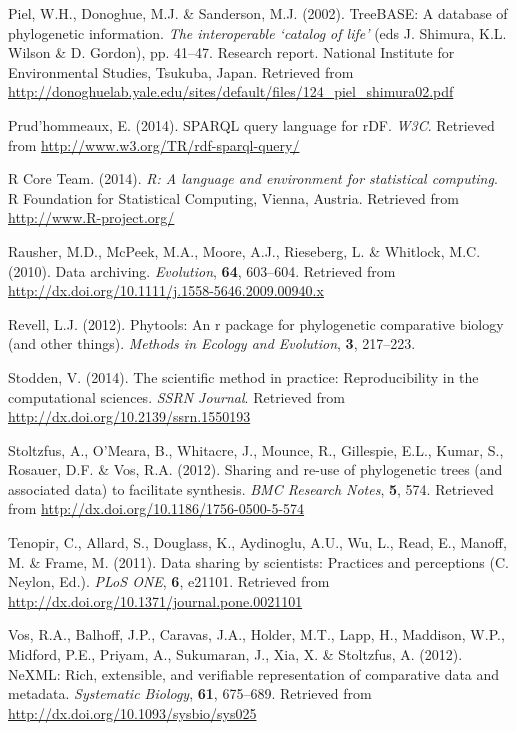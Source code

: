 \documentclass[author-year, review, 11pt]{components/elsarticle} %
\begin{document}
\hypertarget{ref-Pielux5f2002}{}
Piel, W.H., Donoghue, M.J. \& Sanderson, M.J. (2002). TreeBASE: A
database of phylogenetic information. \emph{The interoperable `catalog
of life'} (eds J. Shimura, K.L. Wilson \& D. Gordon), pp. 41--47.
Research report. National Institute for Environmental Studies, Tsukuba,
Japan. Retrieved from
\url{http://donoghuelab.yale.edu/sites/default/files/124_piel_shimura02.pdf}

\hypertarget{ref-W3Cux5f2014}{}
Prud'hommeaux, E. (2014). SPARQL query language for rDF. \emph{W3C}.
Retrieved from \url{http://www.w3.org/TR/rdf-sparql-query/}

\hypertarget{ref-R}{}
R Core Team. (2014). \emph{R: A language and environment for statistical
computing}. R Foundation for Statistical Computing, Vienna, Austria.
Retrieved from \url{http://www.R-project.org/}

\hypertarget{ref-Rausherux5f2010}{}
Rausher, M.D., McPeek, M.A., Moore, A.J., Rieseberg, L. \& Whitlock,
M.C. (2010). Data archiving. \emph{Evolution}, \textbf{64}, 603--604.
Retrieved from \url{http://dx.doi.org/10.1111/j.1558-5646.2009.00940.x}

\hypertarget{ref-Revellux5f2012}{}
Revell, L.J. (2012). Phytools: An r package for phylogenetic comparative
biology (and other things). \emph{Methods in Ecology and Evolution},
\textbf{3}, 217--223.

\hypertarget{ref-Stoddenux5f2014}{}
Stodden, V. (2014). The scientific method in practice: Reproducibility
in the computational sciences. \emph{SSRN Journal}. Retrieved from
\url{http://dx.doi.org/10.2139/ssrn.1550193}

\hypertarget{ref-Stoltzfusux5f2012}{}
Stoltzfus, A., O'Meara, B., Whitacre, J., Mounce, R., Gillespie, E.L.,
Kumar, S., Rosauer, D.F. \& Vos, R.A. (2012). Sharing and re-use of
phylogenetic trees (and associated data) to facilitate synthesis.
\emph{BMC Research Notes}, \textbf{5}, 574. Retrieved from
\url{http://dx.doi.org/10.1186/1756-0500-5-574}

\hypertarget{ref-Tenopirux5f2011}{}
Tenopir, C., Allard, S., Douglass, K., Aydinoglu, A.U., Wu, L., Read,
E., Manoff, M. \& Frame, M. (2011). Data sharing by scientists:
Practices and perceptions (C. Neylon, Ed.). \emph{PLoS ONE}, \textbf{6},
e21101. Retrieved from
\url{http://dx.doi.org/10.1371/journal.pone.0021101}

\hypertarget{ref-Vosux5f2012}{}
Vos, R.A., Balhoff, J.P., Caravas, J.A., Holder, M.T., Lapp, H.,
Maddison, W.P., Midford, P.E., Priyam, A., Sukumaran, J., Xia, X. \&
Stoltzfus, A. (2012). NeXML: Rich, extensible, and verifiable
representation of comparative data and metadata. \emph{Systematic
Biology}, \textbf{61}, 675--689. Retrieved from
\url{http://dx.doi.org/10.1093/sysbio/sys025}
\end{document}
